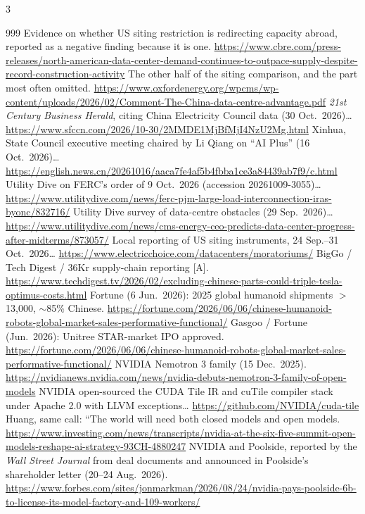 \begin{multicols}{3}
\begin{thebibliography}{999}
 Evidence on whether US siting restriction is redirecting capacity abroad, reported as a negative finding because it is one. \url{https://www.cbre.com/press-releases/north-american-data-center-demand-continues-to-outpace-supply-despite-record-construction-activity}
 The other half of the siting comparison, and the part most often omitted. \url{https://www.oxfordenergy.org/wpcms/wp-content/uploads/2026/02/Comment-The-China-data-centre-advantage.pdf}
 \emph{21st Century Business Herald}, citing China Electricity Council data (30 Oct.\ 2026)… \url{https://www.sfccn.com/2026/10-30/2MMDE1MjBfMjI4NzU2Mg.html}
 Xinhua, State Council executive meeting chaired by Li Qiang on ``AI Plus'' (16 Oct.\ 2026)… \url{https://english.news.cn/20261016/aaca7fe4af5b4fbba1ce3a84439ab7f9/c.html}
 Utility Dive on FERC's order of 9 Oct.\ 2026 (accession 20261009-3055)… \url{https://www.utilitydive.com/news/ferc-pjm-large-load-interconnection-iras-byonc/832716/}
 Utility Dive survey of data-centre obstacles (29 Sep.\ 2026)… \url{https://www.utilitydive.com/news/cms-energy-ceo-predicts-data-center-progress-after-midterms/873057/}
 Local reporting of US siting instruments, 24 Sep.--31 Oct.\ 2026… \url{https://www.electricchoice.com/datacenters/moratoriums/}
 BigGo / Tech Digest / 36Kr supply-chain reporting [A]. \url{https://www.techdigest.tv/2026/02/excluding-chinese-parts-could-triple-tesla-optimus-costs.html}
 Fortune (6 Jun.\ 2026): 2025 global humanoid shipments $>$13,000, $\sim$85\% Chinese. \url{https://fortune.com/2026/06/06/chinese-humanoid-robots-global-market-sales-performative-functional/}
 Gasgoo / Fortune (Jun.\ 2026): Unitree STAR-market IPO approved. \url{https://fortune.com/2026/06/06/chinese-humanoid-robots-global-market-sales-performative-functional/}
 NVIDIA Nemotron 3 family (15 Dec.\ 2025). \url{https://nvidianews.nvidia.com/news/nvidia-debuts-nemotron-3-family-of-open-models}
 NVIDIA open-sourced the CUDA Tile IR and cuTile compiler stack under Apache 2.0 with LLVM exceptions… \url{https://github.com/NVIDIA/cuda-tile}
 Huang, same call: ``The world will need both closed models and open models. \url{https://www.investing.com/news/transcripts/nvidia-at-the-six-five-summit-open-models-reshape-ai-strategy-93CH-4880247}
 NVIDIA and Poolside, reported by the \emph{Wall Street Journal} from deal documents and announced in Poolside's shareholder letter (20--24 Aug.\ 2026). \url{https://www.forbes.com/sites/jonmarkman/2026/08/24/nvidia-pays-poolside-6b-to-license-its-model-factory-and-109-workers/}

\end{thebibliography}
\end{multicols}
